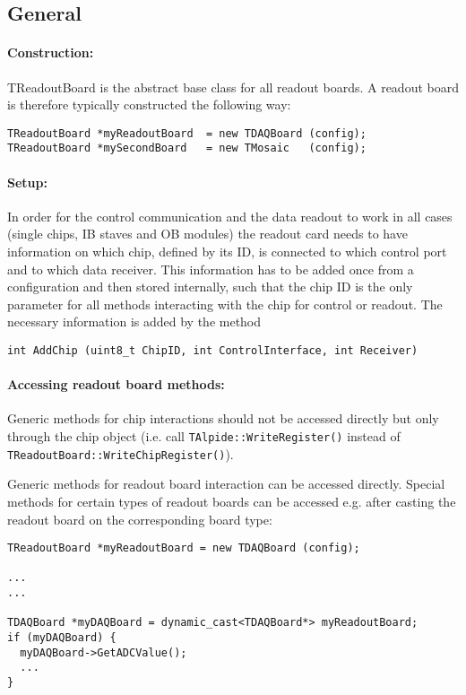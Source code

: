\documentclass{article}
\begin{document}
\subsection{General}


\paragraph {Construction:}

TReadoutBoard is the abstract base class for all readout boards. A
readout board is therefore typically constructed the following way: 

\begin{verbatim}
TReadoutBoard *myReadoutBoard  = new TDAQBoard (config);
TReadoutBoard *mySecondBoard   = new TMosaic   (config);
\end{verbatim}

\paragraph {Setup:}
In order for the control communication and the data readout to work in
all cases (single chips, IB staves and OB modules) the readout card
needs to have information on which chip, defined by its ID, is
connected to which control port and to which data receiver. This
information has to be added once from a configuration and then stored
internally, such that the chip ID is the only parameter for all
methods interacting with the chip for control or readout. The
necessary information is added by the method 

\begin{verbatim}
int AddChip (uint8_t ChipID, int ControlInterface, int Receiver)
\end{verbatim}

\paragraph {Accessing readout board methods:} 
Generic methods for chip interactions should not be accessed directly
but only through the chip object (i.e. call \texttt{TAlpide::WriteRegister()}
instead of \texttt{TReadoutBoard::WriteChipRegister()}).

Generic methods for readout board interaction can be accessed
directly. Special methods for certain types of readout boards can be
accessed e.g. after casting the readout board on the corresponding
board type: 

\begin{verbatim}
TReadoutBoard *myReadoutBoard = new TDAQBoard (config);

...
...

TDAQBoard *myDAQBoard = dynamic_cast<TDAQBoard*> myReadoutBoard;
if (myDAQBoard) {
  myDAQBoard->GetADCValue();
  ...
}
\end{verbatim}
\end{document}
